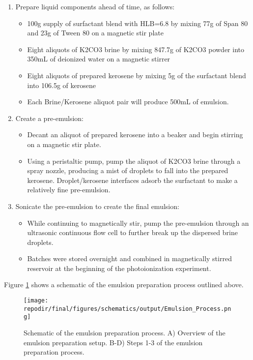 
\begin{enumerate}
    \item Prepare liquid components ahead of time, as follows:
    \begin{itemize}
        \item 100g supply of surfactant blend with HLB=6.8 by mixing 77g of Span 80 and 23g of Tween 80 on a magnetic stir plate 
        \item Eight aliquots of K2CO3 brine by mixing 847.7g of K2CO3 powder into 350mL of deionized water on a magnetic stirrer 
        \item Eight aliquots of prepared kerosene by mixing 5g of the surfactant blend into 106.5g of kerosene  
        \item Each Brine/Kerosene aliquot pair will produce 500mL of emulsion. 
    \end{itemize}

    \item Create a pre-emulsion:
    \begin{itemize}
        \item Decant an aliquot of prepared kerosene into a beaker and begin stirring on a magnetic stir plate. 
        \item Using a peristaltic pump, pump the aliquot of K2CO3 brine through a spray nozzle, producing a mist of droplets to fall into the prepared kerosene. Droplet/kerosene interfaces adsorb the surfactant to make a relatively fine pre-emulsion. 
    \end{itemize}

    \item Sonicate the pre-emulsion to create the final emulsion:
    \begin{itemize}
        \item While continuing to magnetically stir, pump the pre-emulsion through an ultrasonic continuous flow cell to further break up the dispersed brine droplets. 
        \item Batches were stored overnight and combined in magnetically stirred reservoir at the beginning of the photoionization experiment. 
    \end{itemize}
\end{enumerate}

Figure \ref{fig:SI_Emulsion_Process} shows a schematic of the emulsion preparation process outlined above. 


\begin{figure}[]
\centering
\texttt{[image: \\repodir/final/figures/schematics/output/Emulsion\_Process.png]}
\caption{Schematic of the emulsion preparation process. A) Overview of the emulsion preparation setup. B-D) Steps 1-3 of the emulsion preparation process.}
\label{fig:SI_Emulsion_Process}
\end{figure}


